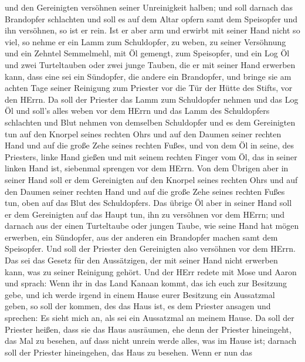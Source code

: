 und den Gereinigten versöhnen seiner Unreinigkeit halben; und soll
darnach das Brandopfer schlachten  und soll es auf dem
Altar opfern samt dem Speisopfer und ihn versöhnen, so ist er rein.
 Ist er aber arm und erwirbt mit seiner Hand nicht so viel,
so nehme er ein Lamm zum Schuldopfer, zu weben, zu seiner Versöhnung und
ein Zehntel Semmelmehl, mit Öl gemengt, zum Speisopfer, und ein Log Öl
 und zwei Turteltauben oder zwei junge Tauben, die er mit
seiner Hand erwerben kann, dass eine sei ein Sündopfer, die andere ein
Brandopfer,  und bringe sie am achten Tage seiner Reinigung
zum Priester vor die Tür der Hütte des Stifts, vor den HErrn.
 Da soll der Priester das Lamm zum Schuldopfer nehmen und
das Log Öl und soll's alles weben vor dem HErrn  und das
Lamm des Schuldopfers schlachten und Blut nehmen von demselben
Schuldopfer und es dem Gereinigten tun auf den Knorpel seines rechten
Ohrs und auf den Daumen seiner rechten Hand und auf die große Zehe
seines rechten Fußes,  und von dem Öl in seine, des
Priesters, linke Hand gießen  und mit seinem rechten Finger
vom Öl, das in seiner linken Hand ist, siebenmal sprengen vor dem HErrn.
 Von dem Übrigen aber in seiner Hand soll er dem
Gereinigten auf den Knorpel seines rechten Ohrs und auf den Daumen
seiner rechten Hand und auf die große Zehe seines rechten Fußes tun,
oben auf das Blut des Schuldopfers.  Das übrige Öl aber in
seiner Hand soll er dem Gereinigten auf das Haupt tun, ihn zu versöhnen
vor dem HErrn;  und darnach aus der einen Turteltaube oder
jungen Taube, wie seine Hand hat mögen erwerben,  ein
Sündopfer, aus der anderen ein Brandopfer machen samt dem Speisopfer.
Und soll der Priester den Gereinigten also versöhnen vor dem HErrn.
 Das sei das Gesetz für den Aussätzigen, der mit seiner
Hand nicht erwerben kann, was zu seiner Reinigung gehört. 
Und der HErr redete mit Mose und Aaron und sprach:  Wenn
ihr in das Land Kanaan kommt, das ich euch zur Besitzung gebe, und ich
werde irgend in einem Hause eurer Besitzung ein Aussatzmal geben,
 so soll der kommen, des das Haus ist, es dem Priester
ansagen und sprechen: Es sieht mich an, als sei ein Aussatzmal an meinem
Hause.  Da soll der Priester heißen, dass sie das Haus
ausräumen, ehe denn der Priester hineingeht, das Mal zu besehen, auf
dass nicht unrein werde alles, was im Hause ist; darnach soll der
Priester hineingehen, das Haus zu besehen.  Wenn er nun das
